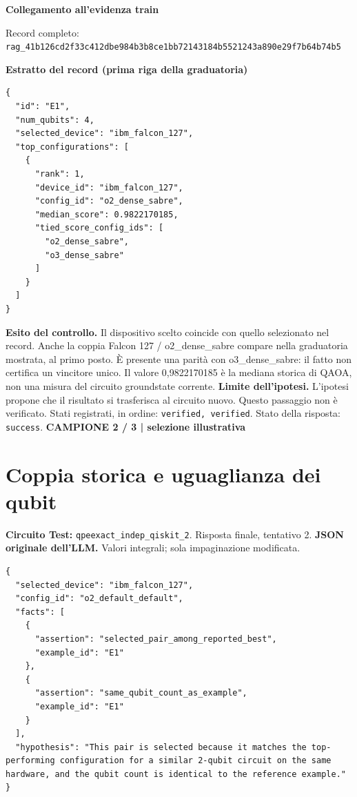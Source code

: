 \documentclass[a4paper,10pt]{article}
\newcommand{\tagline}[1]{{\small\color{ink}\textbf{#1}}\par}
\begin{document}
\textbf{Collegamento all'evidenza train}
\begin{center}\end{center}
{\footnotesize Record completo: \texttt{rag\_41b126cd2f33c412dbe984b3b8ce1bb72143184b5521243a890e29f7b64b74b5}}\par
\textbf{Estratto del record (prima riga della graduatoria)}
\begin{lstlisting}
{
  "id": "E1",
  "num_qubits": 4,
  "selected_device": "ibm_falcon_127",
  "top_configurations": [
    {
      "rank": 1,
      "device_id": "ibm_falcon_127",
      "config_id": "o2_dense_sabre",
      "median_score": 0.9822170185,
      "tied_score_config_ids": [
        "o2_dense_sabre",
        "o3_dense_sabre"
      ]
    }
  ]
}
\end{lstlisting}

\textbf{Esito del controllo.} Il dispositivo scelto coincide con quello selezionato nel record. Anche la coppia Falcon 127 / o2\_dense\_sabre compare nella graduatoria mostrata, al primo posto. È presente una parità con o3\_dense\_sabre: il fatto non certifica un vincitore unico. Il valore 0,9822170185 è la mediana storica di QAOA, non una misura del circuito groundstate corrente.
{\color{warn}\textbf{Limite dell'ipotesi.}} L'ipotesi propone che il risultato si trasferisca al circuito nuovo. Questo passaggio non è verificato.
{\small Stati registrati, in ordine: \texttt{verified, verified}. Stato della risposta: \texttt{success}.}
\newpage
\tagline{CAMPIONE 2 / 3 | selezione illustrativa}
\section*{Coppia storica e uguaglianza dei qubit}
\textbf{Circuito Test:} \texttt{qpeexact\_indep\_qiskit\_2}. Risposta finale, tentativo 2.
\textbf{JSON originale dell'LLM.} Valori integrali; sola impaginazione modificata.
\begin{lstlisting}
{
  "selected_device": "ibm_falcon_127",
  "config_id": "o2_default_default",
  "facts": [
    {
      "assertion": "selected_pair_among_reported_best",
      "example_id": "E1"
    },
    {
      "assertion": "same_qubit_count_as_example",
      "example_id": "E1"
    }
  ],
  "hypothesis": "This pair is selected because it matches the top-performing configuration for a similar 2-qubit circuit on the same hardware, and the qubit count is identical to the reference example."
}
\end{lstlisting}
\end{document}

